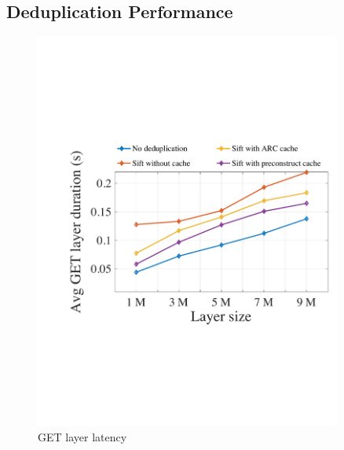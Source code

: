 

\subsection{Deduplication Performance}
\label{sec:eval-dedup}


\begin{figure}[t]
	\centering
	\begin{minipage}{0.3\textwidth}
		\centering
		\includegraphics[width=0.9\textwidth]{graphs/1nodegetlayerlatency.pdf}
		\caption{GET layer latency}
		\label{fig:eval-1nodegetlayerlatency}
	\end{minipage}%
	\begin{minipage}{0.3\textwidth}
		\centering

\end{minipage}
\end{figure}
